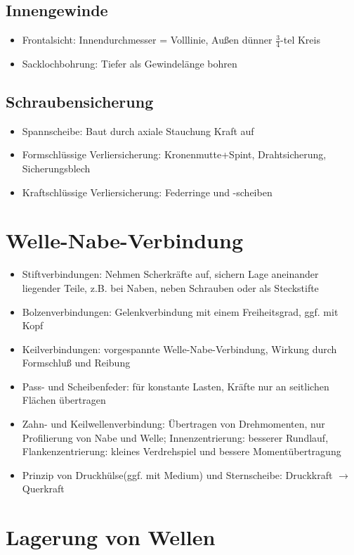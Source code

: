 \documentclass[a4paper,parskip=half*,DIV=7,fontsize=11pt]{scrartcl}
\begin{document}
\subsection{Innengewinde}
\begin{itemize}
	\item Frontalsicht: Innendurchmesser = Volllinie, Außen dünner $\frac{3}{4}$-tel Kreis
	\item Sacklochbohrung: Tiefer als Gewindelänge bohren
\end{itemize}
	
\subsection{Schraubensicherung}
\begin{itemize}
	\item Spannscheibe: Baut durch axiale Stauchung Kraft auf
	\item Formschlüssige Verliersicherung: Kronenmutte+Spint, Drahtsicherung, Sicherungsblech
	\item Kraftschlüssige Verliersicherung: Federringe und -scheiben
\end{itemize}
	
\section{Welle-Nabe-Verbindung}
\begin{itemize}
	\item Stiftverbindungen: Nehmen Scherkräfte auf, sichern Lage aneinander liegender Teile, z.B. bei Naben, neben Schrauben oder als Steckstifte
	\item Bolzenverbindungen: Gelenkverbindung mit einem Freiheitsgrad, ggf. mit Kopf
	\item Keilverbindungen: vorgespannte Welle-Nabe-Verbindung, Wirkung durch Formschluß und Reibung
	\item Pass- und Scheibenfeder: für konstante Lasten, Kräfte nur an seitlichen Flächen übertragen
	\item Zahn- und Keilwellenverbindung: Übertragen von Drehmomenten, nur Profilierung von Nabe und Welle; Innenzentrierung: besserer Rundlauf, Flankenzentrierung: kleines Verdrehspiel und bessere Momentübertragung
	\item Prinzip von Druckhülse(ggf. mit Medium) und Sternscheibe: Druckkraft $\rightarrow$ Querkraft
\end{itemize}	
	
\section{Lagerung von Wellen}
\end{document}
